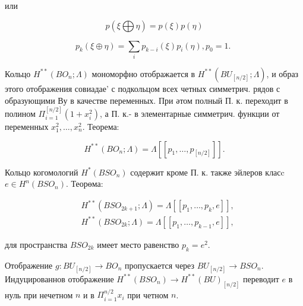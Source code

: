 \documentclass[10pt]{article}
\begin{document}
или



\[

p(\xi \bigoplus \eta)=p(\xi) p(\eta)

\]



\[

p_{k}(\xi \oplus \eta)=\sum_{i} p_{k-i}(\xi) p_{i}(\eta), p_{0}=1 \text {. }

\]



Кольцо $H^{* *}\left(B O_{n} ; \Lambda\right)$ мономорфно отображается в $H^{* *}\left(B U_{[n / 2]} ; \Lambda\right)$, и образ этого отображения совиадае' с подкольцом всех четных симметрич. рядов с образующими Ву в качестве переменных. При әтом полный П. к. переходит в полином $\Pi_{i=1}^{[n / 2]}\left(1+x_{i}^{2}\right)$, а П. к.- в элементарные симметрич. функции от переменных $x_{1}^{2}, \ldots, x_{n}^{2}$. Теорема:



\[

H^{* *}\left(B O_{n} ; \Lambda\right)=\Lambda\left[\left[p_{1}, \ldots, p_{[n / 2]}\right]\right] .

\]



Кольцо когомологий $H^{*}\left(B S O_{n}\right)$ содержит кроме П. к. также эйлеров класc $e \in H^{n}\left(B S O_{n}\right)$. Теорөма:



\[

\begin{aligned}

& H^{* *}\left(B S O_{2 k+1} ; \Lambda\right)=\Lambda\left[\left[p_{1}, \ldots, p_{k}, e\right]\right], \\

& H^{* *}\left(B S O_{2 k} ; \Lambda\right)=\Lambda\left[\left[p_{1}, \ldots, p_{k-1}, e\right]\right],

\end{aligned}

\]



для пространства $B S O_{2 k}$ имеет место равенство $p_{k}=e^{2}$.



Отображение $g: B U_{[n / 2]} \rightarrow B O_{n}$ пропускается через $B U_{[n / 2]} \rightarrow B S O_{n}$. Индуцированнов отображение $H^{* *}\left(B S O_{n}\right) \rightarrow H^{* *}(B U)_{[n / 2]}$ переводит $e$ в нуль при нечетном $n$ и в $\Pi_{i=1}^{n / 2} x_{i}$ при четном $n$.
\end{document}

